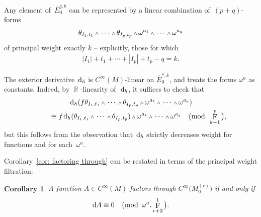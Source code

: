 \documentclass[pdftex]{sigma}
\DeclareMathOperator{\R}{\mathbb{R}}
\renewcommand{\d}{{\rm d}}
\newcommand{\cinfinity}[1]{C^\infty\big(#1\big)}
\renewcommand{\mod}[1]{\quad\big(\mathrm{mod\enspace} #1\big)}
\newcommand{\w}{{\mathchoice{\,{\scriptstyle\wedge}\,}{{\scriptstyle\wedge}}
 {{\scriptscriptstyle\wedge}}{{\scriptscriptstyle\wedge}}}}
\newcommand{\M}[1]{M_0^{(#1)}}
\newcommand{\thetas}[1]{\theta_{#1}}
\DeclareMathOperator{\pwf}{F}
\renewcommand{\dh}{\ensuremath{\hspace{1pt} \d_h}}
\newcommand{\cMinfty}{C^\infty(M)}
\numberwithin{equation}{section}
\newtheorem{Corollary}[Theorem]{Corollary}
\begin{document}
\begin{Example}
 Any element of~$\overline{E}_0^{q,k}$ can be represented by a linear combination of~$(p+q)$-forms
 \begin{gather*}
 \thetas{I_1,t_1}\w\cdots\w\thetas{I_p,t_p}\w\omega^{a_1}\w\cdots\w\omega^{a_{q}}
 \end{gather*}
 of principal weight exactly $k$ -- explicitly, those for which
 \begin{gather*}
 |I_1| + t_1 +\cdots + |I_p| + t_p - q = k .
 \end{gather*}

 The exterior derivative $\dh$ is $\cMinfty$-linear on $\overline{E}_0^{*,k}$, and treats the forms $\omega^a$ as constants. Indeed, by $\R$-linearity of~$\dh$, it suffices to check that
 \begin{gather*}
 \dh (f\thetas{I_1,t_1}\w\cdots\w\thetas{I_p,t_p}\w\omega^{a_1}\w\cdots\w\omega^{a_q})
 \\ \qquad
 {} \equiv f\dh(\thetas{I_1,t_1}\w\cdots\w\thetas{I_p,t_p})\w\omega^{a_1}\w\cdots\w\omega^{a_q} \mod{\pwf^{p}_{k-1}} ,
 \end{gather*}
 but this follows from the observation that $\dh$ strictly decreases weight for functions and for each~$\omega^a$.

 Corollary~\ref{cor: factoring through} can be restated in terms of the principal weight filtration:
 \begin{Corollary}\label{cor:factoring through by weight}
 A function $A \in \cMinfty$ factors through $\cinfinity{\M{r}}$ if and only if
 \begin{gather*}
 \d A \equiv 0 \mod{\omega^a, \pwf^1_{r+2}} .
 \end{gather*}
 \end{Corollary}
\end{Example}
\end{document}
